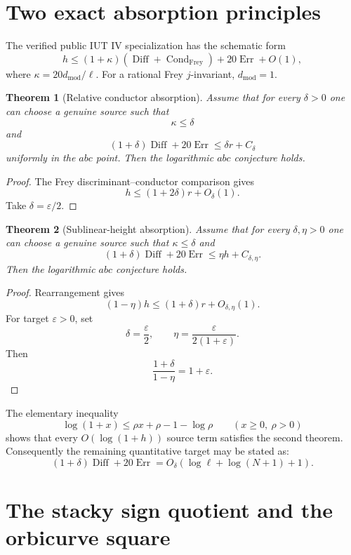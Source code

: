\documentclass[11pt]{article}
\newtheorem{theorem}{Theorem}[section]
\begin{document}
\section{Two exact absorption principles}

The verified public IUT IV specialization has the schematic form
\[
 h\le (1+\kappa)
       (\operatorname{Diff}+\operatorname{Cond}_{\mathrm{Frey}})
      +20\operatorname{Err}+O(1),
\]
where $\kappa=20d_{\mathrm{mod}}/\ell$.  For a rational Frey $j$-invariant,
$d_{\mathrm{mod}}=1$.

\begin{theorem}[Relative conductor absorption]
Assume that for every $\delta>0$ one can choose a genuine source such that
\[
 \kappa\le\delta
\]
and
\[
 (1+\delta)\operatorname{Diff}+20\operatorname{Err}
 \le \delta r+C_\delta
\]
uniformly in the $abc$ point.  Then the logarithmic $abc$ conjecture holds.
\end{theorem}

\begin{proof}
The Frey discriminant--conductor comparison gives
\[
 h\le(1+2\delta)r+O_\delta(1).
\]
Take $\delta=\varepsilon/2$.
\end{proof}

\begin{theorem}[Sublinear-height absorption]
Assume that for every $\delta,\eta>0$ one can choose a genuine source such
that $\kappa\le\delta$ and
\[
 (1+\delta)\operatorname{Diff}+20\operatorname{Err}
 \le \eta h+C_{\delta,\eta}.
\]
Then the logarithmic $abc$ conjecture holds.
\end{theorem}

\begin{proof}
Rearrangement gives
\[
 (1-\eta)h\le(1+\delta)r+O_{\delta,\eta}(1).
\]
For target $\varepsilon>0$, set
\[
 \delta=\frac{\varepsilon}{2},
 \qquad
 \eta=\frac{\varepsilon}{2(1+\varepsilon)}.
\]
Then
\[
 \frac{1+\delta}{1-\eta}=1+\varepsilon.
\]
\end{proof}

The elementary inequality
\[
 \log(1+x)\le \rho x+\rho-1-\log\rho
 \qquad(x\ge0,\ \rho>0)
\]
shows that every $O(\log(1+h))$ source term satisfies the second theorem.
Consequently the remaining quantitative target may be stated as:
\[
 (1+\delta)\operatorname{Diff}+20\operatorname{Err}
   =O_\delta(\log\ell+\log(N+1)+1).
\]

\section{The stacky sign quotient and the orbicurve square}
\end{document}
